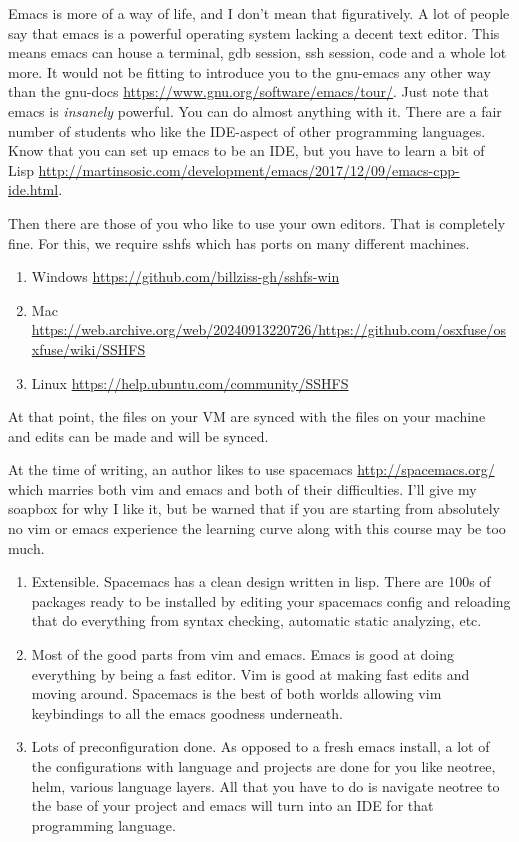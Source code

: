 Emacs is more of a way of life, and I don't mean that figuratively.
A lot of people say that emacs is a powerful operating system lacking a decent text editor.
This means emacs can house a terminal, gdb session, ssh session, code and a whole lot more.
It would not be fitting to introduce you to the gnu-emacs any other way than the gnu-docs \url{https://www.gnu.org/software/emacs/tour/}.
Just note that emacs is \textit{insanely} powerful.
You can do almost anything with it.
There are a fair number of students who like the IDE-aspect of other programming languages.
Know that you can set up emacs to be an IDE, but you have to learn a bit of Lisp \url{http://martinsosic.com/development/emacs/2017/12/09/emacs-cpp-ide.html}.

Then there are those of you who like to use your own editors. That is completely fine.
For this, we require sshfs which has ports on many different machines.

\begin{enumerate}
\item Windows \url{https://github.com/billziss-gh/sshfs-win}
\item Mac \url{https://web.archive.org/web/20240913220726/https://github.com/osxfuse/osxfuse/wiki/SSHFS}
\item Linux \url{https://help.ubuntu.com/community/SSHFS}
\end{enumerate}

At that point, the files on your VM are synced with the files on your machine and edits can be made and will be synced.

At the time of writing, an author likes to use spacemacs \url{http://spacemacs.org/} which marries both vim and emacs and both of their difficulties.
I'll give my soapbox for why I like it, but be warned that if you are starting from absolutely no vim or emacs experience the learning curve along with this course may be too much.
\begin{enumerate}
\item Extensible. Spacemacs has a clean design written in lisp. There are 100s of packages ready to be installed by editing your spacemacs config and reloading that do everything from syntax checking, automatic static analyzing, etc.
\item Most of the good parts from vim and emacs. Emacs is good at doing everything by being a fast editor. Vim is good at making fast edits and moving around. Spacemacs is the best of both worlds allowing vim keybindings to all the emacs goodness underneath.
\item Lots of preconfiguration done. As opposed to a fresh emacs install, a lot of the configurations with language and projects are done for you like neotree, helm, various language layers. All that you have to do is navigate neotree to the base of your project and emacs will turn into an IDE for that programming language.
\end{enumerate}


